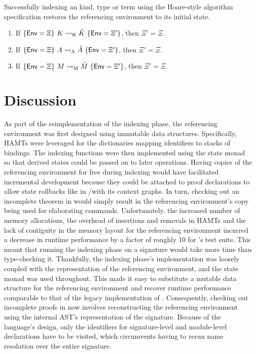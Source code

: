 \begin{corollary}
Successfully indexing an \LF kind, type or term using the Hoare-style algorithm specification restores the referencing environment to its initial state.
\begin{enumerate}
\item If $\{\mathsf{Env} = \Xi\}\ K \rightsquigarrow_{{\normalfont\text{K}}} \tilde K\ \{\mathsf{Env} = \Xi'\}$, then $\Xi' = \Xi$.
\item If $\{\mathsf{Env} = \Xi\}\ A \rightsquigarrow_{{\normalfont\text{A}}} \tilde A\ \{\mathsf{Env} = \Xi'\}$, then $\Xi' = \Xi$.
\item If $\{\mathsf{Env} = \Xi\}\ M \rightsquigarrow_{{\normalfont\text{M}}} \tilde M\ \{\mathsf{Env} = \Xi'\}$, then $\Xi' = \Xi$.
\end{enumerate}
\end{corollary}

\section{Discussion}

As part of the reimplementation of the indexing phase, the referencing environment was first designed using immutable data structures.
Specifically, \acp{HAMT} were leveraged for the dictionaries mapping identifiers to stacks of bindings.
The indexing functions were then implemented using the state monad so that derived states could be passed on to later operations.
Having copies of the referencing environment for free during indexing would have facilitated incremental development because they could be attached to proof declarations to allow state rollbacks like in \Isabelle/\Isar with its context graphs.
In turn, checking out an incomplete theorem in \Harpoon would simply result in the referencing environment's copy being used for elaborating commands.
Unfortunately, the increased number of memory allocations, the overhead of insertions and removals in \acp{HAMT} and the lack of contiguity in the memory layout for the referencing environment incurred a decrease in runtime performance by a factor of roughly 10 for \Beluga's test suite.
This meant that running the indexing phase on a signature would take more time than type-checking it.
Thankfully, the indexing phase's implementation was loosely coupled with the representation of the referencing environment, and the state monad was used throughout.
This made it easy to substitute a mutable data structure for the referencing environment and recover runtime performance comparable to that of the legacy implementation of \Beluga.
Consequently, checking out incomplete proofs in \Harpoon now involves reconstructing the referencing environment using the internal \ac{AST}'s representation of the signature.
Because of the language's design, only the identifiers for signature-level and module-level declarations have to be visited, which circumvents having to rerun name resolution over the entire signature.

